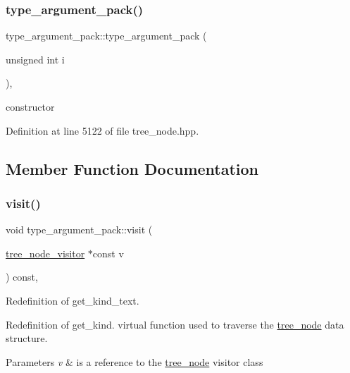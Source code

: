 \subsubsection{\texorpdfstring{type\+\_\+argument\+\_\+pack()}{type\_argument\_pack()}}
{\footnotesize\ttfamily type\+\_\+argument\+\_\+pack\+::type\+\_\+argument\+\_\+pack (\begin{DoxyParamCaption}\item[{unsigned int}]{i }\end{DoxyParamCaption})\hspace{0.3cm}{\ttfamily [inline]}, {\ttfamily [explicit]}}



constructor 



Definition at line 5122 of file tree\+\_\+node.\+hpp.



\subsection{Member Function Documentation}
\mbox{\label{structtype__argument__pack_a1367b4b509c18a5ba865cccc463d6172}} 
\subsubsection{\texorpdfstring{visit()}{visit()}}
{\footnotesize\ttfamily void type\+\_\+argument\+\_\+pack\+::visit (\begin{DoxyParamCaption}\item[{\hyperlink{classtree__node__visitor}{tree\+\_\+node\+\_\+visitor} $\ast$const}]{v }\end{DoxyParamCaption}) const\hspace{0.3cm}{\ttfamily [override]}, {\ttfamily [virtual]}}



Redefinition of get\+\_\+kind\+\_\+text. 

Redefinition of get\+\_\+kind. virtual function used to traverse the \hyperlink{classtree__node}{tree\+\_\+node} data structure. 
\begin{DoxyParams}{Parameters}
{\em v} & is a reference to the \hyperlink{classtree__node}{tree\+\_\+node} visitor class \\
\hline
\end{DoxyParams}


